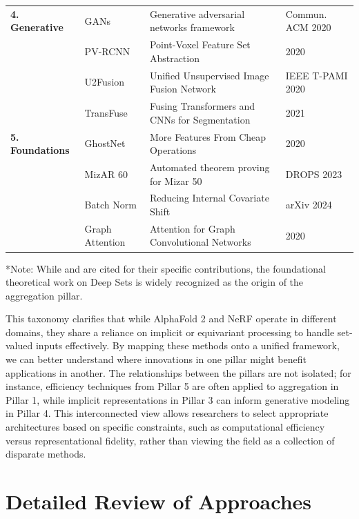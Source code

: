 \documentclass{article}
\begin{document}
\begin{table}[ht]
{\begin{tabular}{llll}
\textbf{4. Generative} & GANs \cite{goodfellow2020generative} & Generative adversarial networks framework & Commun. ACM 2020 \\
 & PV-RCNN \cite{shi2020pvrcnn} & Point-Voxel Feature Set Abstraction & 2020 \\
 & U2Fusion \cite{xu2020ufusion} & Unified Unsupervised Image Fusion Network & IEEE T-PAMI 2020 \\
 & TransFuse \cite{zhang2021transfuse} & Fusing Transformers and CNNs for Segmentation & 2021 \\
\textbf{5. Foundations} & GhostNet \cite{han2020ghostnet} & More Features From Cheap Operations & 2020 \\
 & MizAR 60 \cite{jan2023mizar} & Automated theorem proving for Mizar 50 & DROPS 2023 \\
 & Batch Norm \cite{ioffe2024batch} & Reducing Internal Covariate Shift & arXiv 2024 \\
 & Graph Attention \cite{wang2020ecanet} & Attention for Graph Convolutional Networks & 2020 \\
\bottomrule
\end{tabular}
}
\end{table}

*Note: While \cite{wu2020comprehensive} and \cite{baek2021accurate} are cited for their specific contributions, the foundational theoretical work on Deep Sets is widely recognized as the origin of the aggregation pillar.

This taxonomy clarifies that while AlphaFold 2 and NeRF operate in different domains, they share a reliance on implicit or equivariant processing to handle set-valued inputs effectively. By mapping these methods onto a unified framework, we can better understand where innovations in one pillar might benefit applications in another. The relationships between the pillars are not isolated; for instance, efficiency techniques from Pillar 5 are often applied to aggregation in Pillar 1, while implicit representations in Pillar 3 can inform generative modeling in Pillar 4. This interconnected view allows researchers to select appropriate architectures based on specific constraints, such as computational efficiency versus representational fidelity, rather than viewing the field as a collection of disparate methods.

\section{Detailed Review of Approaches}
\end{document}
